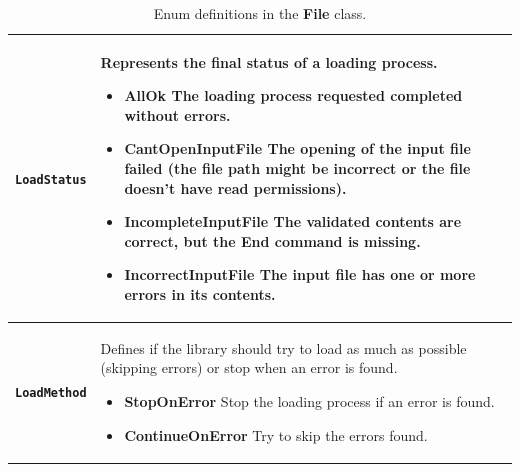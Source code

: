 \documentclass[11pt,twoside,openany,x11names,svgnames]{memoir}
\begin{document}
\begin{table}\footnotesize
\centering
\begin{tabular}{| >{\bfseries}p{2cm} | p{13.5cm} |}
	\hline
	
	\texttt{LoadStatus} & \parbox[t]{13.5cm}{Represents the final status of a loading process.\\
	                                      \begin{itemize}
						                  	\item \textbf{AllOk} The loading process requested completed without errors.
						                    \item \textbf{CantOpenInputFile} The opening of the input file failed (the file path might be incorrect or the file doesn't have read permissions).
						                    \item \textbf{IncompleteInputFile} The validated contents are correct, but the \textbf{End} command is missing.
						                    \item \textbf{IncorrectInputFile} The input file has one or more errors in its contents.
						                  \end{itemize}
						                 } \\
	
	\hline		
	
	\texttt{LoadMethod} & \parbox[t]{13.5cm}{Defines if the library should try to load as much as possible (skipping errors) or stop when an error is found.\\
	                                         \begin{itemize}
						                    	\item \textbf{StopOnError} Stop the loading process if an error is found.
						                        \item \textbf{ContinueOnError} Try to skip the errors found.
						                     \end{itemize}
						                    } \\
	
	\hline
\end{tabular}
\caption{Enum definitions in the \textbf{File} class.}
\label{tab:File-Types}
\end{table}
\end{document}
